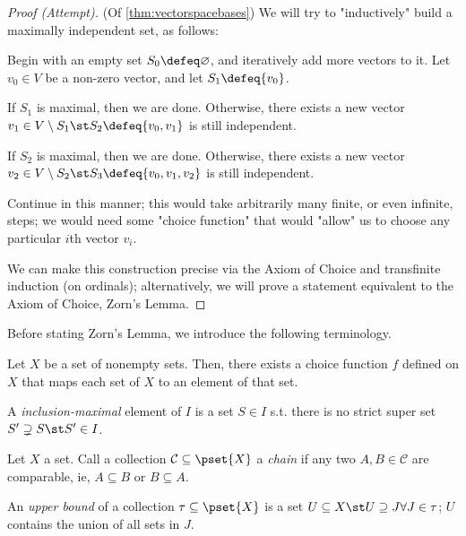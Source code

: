 \begin{proof}[Proof (Attempt)](Of \cref{thm:vectorspacebases})
    We will try to "inductively" build a maximally independent set, as follows:
    
    Begin with an empty set $S_0 \defeq \varnothing$, and iteratively add more vectors to it. Let $v_0 \in V$ be a non-zero vector, and let $S_1 \defeq \{v_0\}$.

    If $S_1$ is maximal, then we are done. Otherwise, there exists a new vector $v_1 \in V \setminus S_1 \st S_2 \defeq \{v_0, v_1\}$ is still independent.

    If $S_2$ is maximal, then we are done. Otherwise, there exists a new vector $v_2 \in V \setminus S_2 \st S_3 \defeq \{v_0, v_1, v_2\}$ is still independent.

    Continue in this manner; this would take arbitrarily many finite, or even infinite, steps; we would need some "choice function" that would "allow" us to choose any particular $i$th vector $v_i$. 
    
    We can make this construction precise via the Axiom of Choice and transfinite induction (on ordinals); alternatively, we will prove a statement equivalent to the Axiom of Choice, Zorn's Lemma.
\end{proof}

\begin{remark}
    Before stating Zorn's Lemma, we introduce the following terminology.
\end{remark}

\begin{axiom}
    Let $X$ be a set of nonempty sets. Then, there exists a choice function $f$ defined on $X$ that maps each set of $X$ to an element of that set.
\end{axiom}

\begin{definition}
    A \emph{inclusion-maximal} element of $I$ is a set $S \in I$ s.t. there is no strict super set $S' \supsetneq S \st S' \in I$. 
\end{definition}

\begin{definition}[Chain]
    Let $X$ a set. Call a collection $\mathcal{C} \subseteq \pset{X}$ a \emph{chain} if any two $A, B \in \mathcal{C}$ are comparable, ie, $A \subseteq B$ or $B \subseteq A$.
\end{definition}

\begin{definition}
    An \emph{upper bound} of a collection $\tau \subseteq \pset{X}$ is a set $U \subseteq X \st U \supseteq J \forall J \in \tau$; $U$ contains the union of all sets in $J$.
\end{definition}


